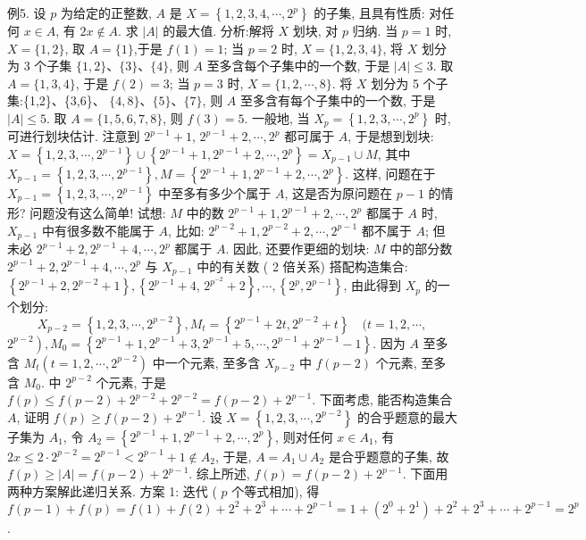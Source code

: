 例5. 设 $p$ 为给定的正整数, $A$ 是 $X=\left\{1,2,3,4, \cdots, 2^p\right\}$ 的子集, 且具有性质: 对任何 $x \in A$, 有 $2 x \notin A$. 求 $|A|$ 的最大值.
分析:解将 $X$ 划块, 对 $p$ 归纳.
当 $p=1$ 时, $X=\{1,2\}$, 取 $A=\{1\}$,于是 $f(1)=1$;
当 $p=2$ 时, $X=\{1,2,3,4\}$, 将 $X$ 划分为 3 个子集 $\{1,2\} 、\{3\} 、\{4\}$, 则 $A$ 至多含每个子集中的一个数, 于是 $|A| \leqslant 3$. 取 $A=\{1,3,4\}$, 于是 $f(2)=3$;
当 $p=3$ 时, $X=\{1,2, \cdots, 8\}$. 将 $X$ 划分为 5 个子集:\{1,2\}、\{3,6\}、 $\{4,8\} 、\{5\} 、\{7\}$, 则 $A$ 至多含有每个子集中的一个数, 于是 $|A| \leqslant 5$. 取 $A=\{1,5,6,7,8\}$, 则 $f(3)=5$.
一般地, 当 $X_p=\left\{1,2,3, \cdots, 2^p\right\}$ 时, 可进行划块估计.
注意到 $2^{p-1}+1$, $2^{p-1}+2, \cdots, 2^p$ 都可属于 $A$, 于是想到划块: $X=\left\{1,2,3, \cdots, 2^{p-1}\right\} \cup\left\{2^{p-1}+\right. \left.1,2^{p-1}+2, \cdots, 2^p\right\}=X_{p-1} \cup M$, 其中 $X_{p-1}=\left\{1,2,3, \cdots, 2^{p-1}\right\}, M=\left\{2^{p-1}+\right. \left.1,2^{p-1}+2, \cdots, 2^p\right\}$. 这样, 问题在于 $X_{p-1}=\left\{1,2,3, \cdots, 2^{p-1}\right\}$ 中至多有多少个属于 $A$, 这是否为原问题在 $p-1$ 的情形? 问题没有这么简单! 试想: $M$ 中的数 $2^{p-1}+1,2^{p-1}+2, \cdots, 2^p$ 都属于 $A$ 时, $X_{p-1}$ 中有很多数不能属于 $A$, 比如: $2^{p-2}+1,2^{p-2}+2, \cdots, 2^{p-1}$ 都不属于 $A$; 但未必 $2^{p-1}+2,2^{p-1}+4, \cdots, 2^p$ 都属于 $A$. 因此, 还要作更细的划块: $M$ 中的部分数 $2^{p-1}+2,2^{p-1}+4, \cdots, 2^p$ 与 $X_{p-1}$ 中的有关数 ( 2 倍关系) 搭配构造集合: $\left\{2^{p-1}+2,2^{p-2}+1\right\},\left\{2^{p-1}+4\right.$, $\left.2^{p^{-2}}+2\right\}, \cdots,\left\{2^p, 2^{p-1}\right\}$, 由此得到 $X_p$ 的一个划分:
$$
X_{p-2}=\left\{1,2,3, \cdots, 2^{p-2}\right\}, M_t=\left\{2^{p-1}+2 t, 2^{p-2}+t\right\} \quad(t=1,2, \cdots,
$$
$\left.2^{p-2}\right), M_0=\left\{2^{p-1}+1,2^{p-1}+3,2^{p-1}+5, \cdots, 2^{p-1}+2^{p-1}-1\right\}$.
因为 $A$ 至多含 $M_t\left(t=1,2, \cdots, 2^{p-2}\right)$ 中一个元素, 至多含 $X_{p-2}$ 中 $f(p-2)$ 个元素, 至多含 $M_0$. 中 $2^{p-2}$ 个元素, 于是 $f(p) \leqslant f(p-2)+2^{p-2}+ 2^{p-2}=f(p-2)+2^{p-1}$.
下面考虑, 能否构造集合 $A$, 证明 $f(p) \geqslant f(p-2)+2^{p-1}$.
设 $X=\left\{1,2,3, \cdots, 2^{p-2}\right\}$ 的合乎题意的最大子集为 $A_1$, 令 $A_2= \left\{2^{p-1}+1,2^{p-1}+2, \cdots, 2^p\right\}$, 则对任何 $x \in A_1$, 有 $2 x \leqslant 2 \cdot 2^{p-2}=2^{p-1}< 2^{p-1}+1 \notin A_2$, 于是, $A=A_1 \cup A_2$ 是合乎题意的子集, 故 $f(p) \geqslant|A|= f(p-2)+2^{p-1}$.
综上所述, $f(p)=f(p-2)+2^{p-1}$.
下面用两种方案解此递归关系.
方案 1: 迭代 ( $p$ 个等式相加), 得 $f(p-1)+f(p)=f(1)+f(2)+ 2^2+2^3+\cdots+2^{p-1}=1+\left(2^0+2^1\right)+2^2+2^3+\cdots+2^{p-1}=2^p$.
